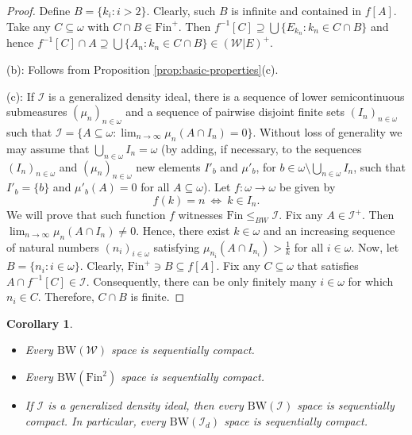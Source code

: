 \documentclass{amsart}
\theoremstyle{plain}
\newtheorem{corollary}[theorem]{Corollary}
\theoremstyle{definition}
\theoremstyle{remark}
\newcommand{\cI}{\mathcal{I}}
\newcommand{\I}{\cI}
\newcommand{\cW}{\mathcal{W}}
\newcommand{\fin}{\mathrm{Fin}}
\newcommand{\BW}{\mathrm{BW}}
\begin{document}
\begin{proof}
Define $B=\{k_i:i>2\}$. Clearly, such $B$ is infinite and contained in $f[A]$. Take any $C \subseteq \omega$ with $C \cap B \in \fin^+$. Then $f^{-1}[C] \supseteq \bigcup\{E_{k_n} : k_n \in C\cap B\}$ and hence $f^{-1}[C]\cap A \supseteq \bigcup\{A_n: k_n \in C \cap B \} \in (\cW|E)^+$.

\medskip

(b): Follows from Proposition \ref{prop:basic-properties}(c).

\medskip

(c): If $\I$ is a generalized density ideal, there is a sequence of lower semicontinuous submeasures $(\mu_n)_{n \in \omega}$ and a sequence of pairwise disjoint finite sets $(I_n)_{n \in \omega}$ such that $\I=\{A \subseteq \omega: \lim_{n \rightarrow \infty} \mu_n(A\cap I_n)=0\}$. Without loss of generality we may assume that $\bigcup_{n\in\omega}I_n=\omega$ (by adding, if necessary, to the sequences $(I_n)_{n \in \omega}$ and $(\mu_n)_{n \in \omega}$ new elements $I'_b$ and $\mu'_b$, for $b\in\omega\setminus\bigcup_{n\in\omega}I_n$, such that $I'_b=\{b\}$ and $\mu'_b(A)=0$ for all $A\subseteq\omega$). Let $f:\omega \rightarrow \omega$ be given by 
\[ f(k)=n\ \iff\ k \in I_n.\]
We will prove that such function $f$ witnesses $\fin \leq_{BW} \I$. Fix any $A \in \I^+$. Then $\lim_{n \rightarrow \infty}\mu_n(A\cap I_n) \neq 0$. Hence, there exist $k \in \omega$ and an increasing sequence of natural numbers $(n_i)_{i \in \omega}$ satisfying $\mu_{n_i}(A\cap I_{n_i})>\frac{1}{k}$ for all $i \in \omega$. Now, let $B=\{n_i:i \in \omega\}$. Clearly, $\fin^+\ni B\subseteq f[A]$. Fix any $C \subseteq \omega$ that satisfies $A\cap f^{-1}[C] \in \I$. Consequently, there can be only finitely many $i \in \omega$ for which $n_i \in C$. Therefore, $C\cap B$ is finite.
\end{proof}

\begin{corollary}\
\label{cor:idealy_powyzej_Fin}
    \begin{itemize}
        \item[(a)] Every $\BW(\cW)$ space is sequentially compact.
        \item[(b)] Every $\BW(\fin^2)$ space is sequentially compact.
        \item[(c)] If $\I$ is a generalized density ideal, then every $\BW(\I)$ space is sequentially compact. In particular, every $\BW(\I_d)$ space is sequentially compact.
    \end{itemize}
\end{corollary}
\end{document}
